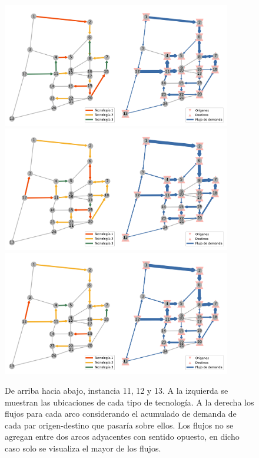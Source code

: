 \documentclass{article}
\begin{document}
  \begin{figure}[h!]
    \centering
    \includegraphics[width=10cm]{../resources/sioux_falls_0.4_budget_factor_linear_5_breakpoints.png}
    \includegraphics[width=10cm]{../resources/sioux_falls_0.4_budget_factor_linear_20_breakpoints.png}
    \includegraphics[width=10cm]{../resources/sioux_falls_0.4_budget_factor_linear_50_breakpoints.png}
    \caption{De arriba hacia abajo, instancia 11, 12 y 13. A la izquierda se muestran las ubicaciones de cada tipo de tecnología. A la derecha los flujos para cada arco considerando el acumulado de demanda de cada par origen-destino que pasaría sobre ellos. Los flujos no se agregan entre dos arcos adyacentes con sentido opuesto, en dicho caso solo se visualiza el mayor de los flujos.}
    \label{fig:sensibilityinstance11_12_13}
  \end{figure}
\end{document}
